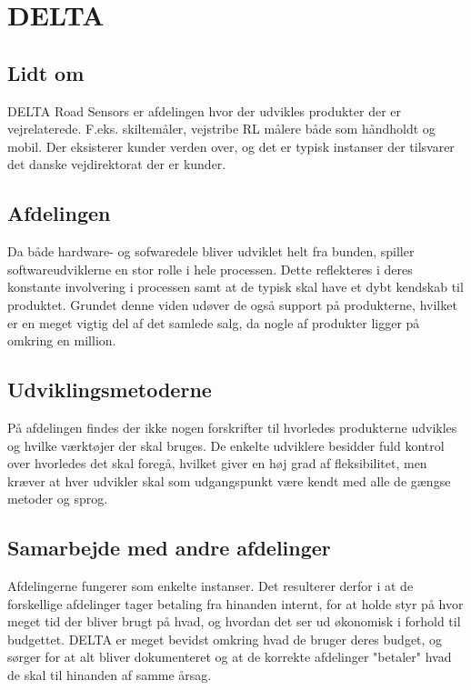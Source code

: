 \section{DELTA}

\subsection{Lidt om}
DELTA Road Sensors er afdelingen hvor der udvikles produkter der er vejrelaterede. F.eks. skiltemåler, vejstribe RL målere både som håndholdt og mobil. Der eksisterer kunder verden over, og det er typisk instanser der tilsvarer det danske vejdirektorat der er kunder.

\subsection{Afdelingen}
Da både hardware- og sofwaredele bliver udviklet helt fra bunden, spiller softwareudviklerne en stor rolle i hele processen. Dette reflekteres i deres konstante involvering i processen samt at de typisk skal have et dybt kendskab til produktet. Grundet denne viden udøver de også support på produkterne, hvilket er en meget vigtig del af det samlede salg, da nogle af produkter ligger på omkring en million.

\subsection{Udviklingsmetoderne}
På afdelingen findes der ikke nogen forskrifter til hvorledes produkterne udvikles og hvilke værktøjer der skal bruges. De enkelte udviklere besidder fuld kontrol over hvorledes det skal foregå, hvilket giver en høj grad af fleksibilitet, men kræver at hver udvikler skal som udgangspunkt være kendt med alle de gængse metoder og sprog.

\subsection{Samarbejde med andre afdelinger}
Afdelingerne fungerer som enkelte instanser.
Det resulterer derfor i at de forskellige afdelinger tager betaling fra hinanden internt, for at holde styr på hvor meget tid der bliver brugt på hvad, og hvordan det ser ud økonomisk i forhold til budgettet. DELTA er meget bevidst omkring hvad de bruger deres budget, og sørger for at alt bliver dokumenteret og at de korrekte afdelinger "betaler" hvad de skal til hinanden af samme årsag.



